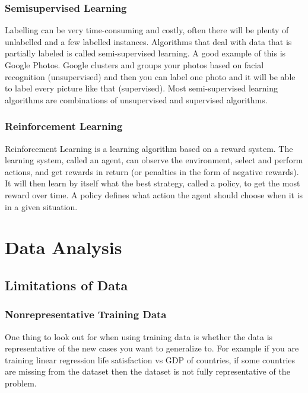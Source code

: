 \documentclass[12pt]{article}
\begin{document}
    \subsubsection{Semisupervised Learning}
        Labelling can be very time-consuming and costly, often there will be plenty of unlabelled and a few labelled
        instances. Algorithms that deal with data that is partially labeled is called semi-supervised learning. A good
        example of this is Google Photos. Google clusters and groups your photos based on facial recognition
        (unsupervised) and then you can label one photo and it will be able to label every picture like that
        (supervised). Most semi-supervised learning algorithms are combinations of unsupervised and supervised
        algorithms.  
    
    \subsubsection{Reinforcement Learning}
        Reinforcement Learning is a learning algorithm based on a reward system. The learning system, called an agent,
        can observe the environment, select and perform actions, and get rewards in return (or penalties in the form of
        negative rewards). It will then learn by itself what the best strategy, called a policy, to get the most reward
        over time. A policy defines what action the agent should choose when it is in a given situation.

\section{Data Analysis}
    \subsection{Limitations of Data}
        \subsubsection{Nonrepresentative Training Data}
        One thing to look out for when using training data is whether the data is representative of the new cases you
        want to generalize to. For example if you are training linear regression life satisfaction vs GDP of countries,
        if some countries are missing from the dataset then the dataset is not fully representative of the problem.
\end{document}
